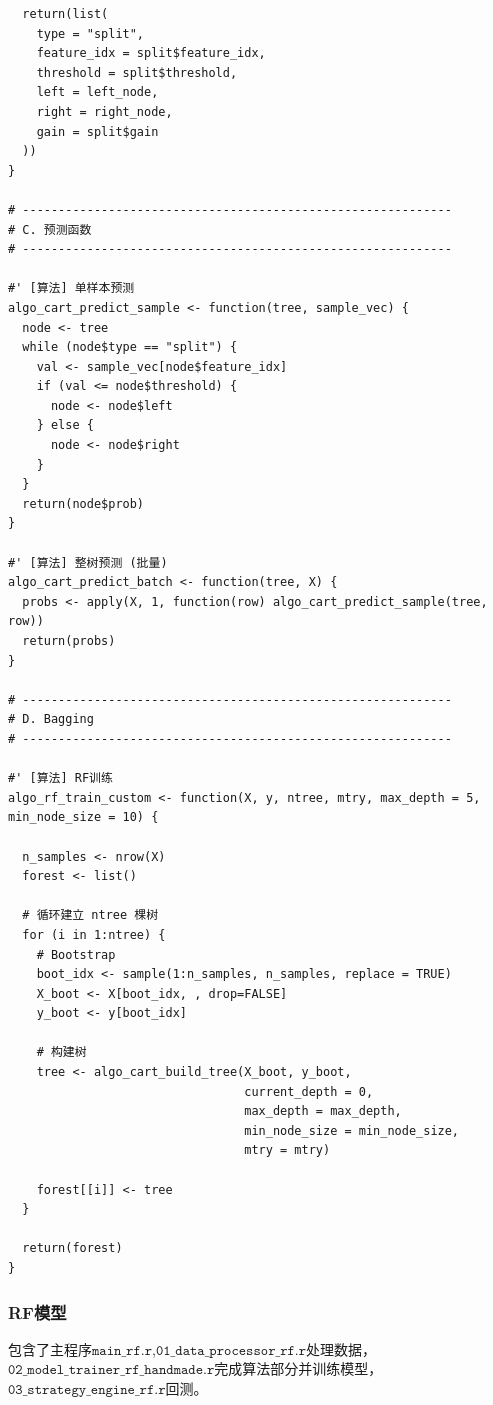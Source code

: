 \documentclass[11pt, a4paper]{article}
\begin{document}
\begin{verbatim}
  return(list(
    type = "split",
    feature_idx = split$feature_idx,
    threshold = split$threshold,
    left = left_node,
    right = right_node,
    gain = split$gain
  ))
}

# ------------------------------------------------------------
# C. 预测函数
# ------------------------------------------------------------

#' [算法] 单样本预测
algo_cart_predict_sample <- function(tree, sample_vec) {
  node <- tree
  while (node$type == "split") {
    val <- sample_vec[node$feature_idx]
    if (val <= node$threshold) {
      node <- node$left
    } else {
      node <- node$right
    }
  }
  return(node$prob)
}

#' [算法] 整树预测 (批量)
algo_cart_predict_batch <- function(tree, X) {
  probs <- apply(X, 1, function(row) algo_cart_predict_sample(tree, row))
  return(probs)
}

# ------------------------------------------------------------
# D. Bagging
# ------------------------------------------------------------

#' [算法] RF训练
algo_rf_train_custom <- function(X, y, ntree, mtry, max_depth = 5, min_node_size = 10) {
  
  n_samples <- nrow(X)
  forest <- list()
  
  # 循环建立 ntree 棵树
  for (i in 1:ntree) {
    # Bootstrap
    boot_idx <- sample(1:n_samples, n_samples, replace = TRUE)
    X_boot <- X[boot_idx, , drop=FALSE]
    y_boot <- y[boot_idx]
    
    # 构建树
    tree <- algo_cart_build_tree(X_boot, y_boot, 
                                 current_depth = 0, 
                                 max_depth = max_depth, 
                                 min_node_size = min_node_size, 
                                 mtry = mtry)
    
    forest[[i]] <- tree
  }
  
  return(forest)
}
\end{verbatim}
\subsubsection{RF模型}
包含了主程序$\texttt{main\_rf.r}$,$\texttt{01\_data\_processor\_rf.r}$处理数据，$\texttt{02\_model\_trainer\_rf\_handmade.r}$完成算法部分并训练模型，$\texttt{03\_strategy\_engine\_rf.r}$回测。
\end{document}
